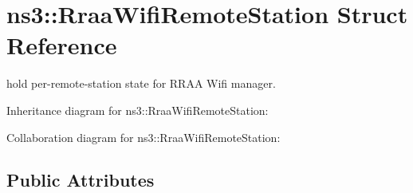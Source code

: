 \hypertarget{structns3_1_1RraaWifiRemoteStation}{}\section{ns3\+:\+:Rraa\+Wifi\+Remote\+Station Struct Reference}
\label{structns3_1_1RraaWifiRemoteStation}


hold per-\/remote-\/station state for R\+R\+AA Wifi manager.  




Inheritance diagram for ns3\+:\+:Rraa\+Wifi\+Remote\+Station\+:


Collaboration diagram for ns3\+:\+:Rraa\+Wifi\+Remote\+Station\+:
\subsection*{Public Attributes}
